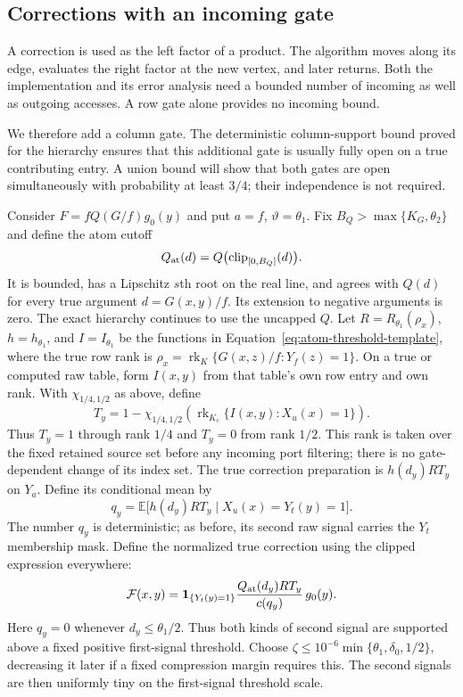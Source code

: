 \subsection{Corrections with an incoming gate}

A correction is used as the left factor of a product. The algorithm moves along its edge, evaluates the right factor at the new vertex, and later returns. Both the implementation and its error analysis need a bounded number of incoming as well as outgoing accesses. A row gate alone provides no incoming bound.

We therefore add a column gate. The deterministic column-support bound proved for the hierarchy ensures that this additional gate is usually fully open on a true contributing entry. A union bound will show that both gates are open simultaneously with probability at least $3/4$; their independence is not required.

Consider $F=fQ(G/f)g_0(y)$ and put $a=f$, $\vartheta=\theta_1$.
Fix $B_Q>\max\{K_G,\theta_2\}$ and define the atom cutoff
\[
 Q_{\rm at}(d)=Q\bigl(\operatorname{clip}_{[0,B_Q]}(d)\bigr).
\]
It is bounded, has a Lipschitz $s$th root on the real line, and agrees
with $Q(d)$ for every true argument $d=G(x,y)/f$.  Its extension to
negative arguments is zero.  The exact hierarchy continues to use the
uncapped $Q$.  Let $R=R_{\theta_1}(\rho_x)$, $h=h_{\theta_1}$, and
$I=I_{\theta_1}$ be the functions in
Equation~\eqref{eq:atom-threshold-template}, where the true row rank is
$\rho_x=\operatorname{rk}_K\{G(x,z)/f:Y_f(z)=1\}$.
On a true or computed raw table, form $I(x,y)$ from that table's own row
entry and own rank.
With $\chi_{1/4,1/2}$ as above, define
\begin{equation}
 T_y=1-\chi_{1/4,1/2}\left(
       \operatorname{rk}_{K_c}\{I(x,y):X_u(x)=1\}\right).
 \label{eq:atom-incoming-gate}
\end{equation}
Thus $T_y=1$ through rank $1/4$ and $T_y=0$ from rank $1/2$.
This rank is taken over the fixed retained source set before any incoming
port filtering; there is no gate-dependent change of its index set.
The true correction preparation is $h(d_y)R T_y$ on $Y_a$.
Define its conditional mean by
\begin{equation}
 q_y=\mathbb E\bigl[h(d_y)R T_y\mid X_u(x)=Y_t(y)=1\bigr].
 \label{eq:atom-correction-denominator}
\end{equation}
The number $q_y$ is deterministic; as before, its second raw signal
carries the $Y_t$ membership mask.  Define the normalized true correction
using the clipped expression everywhere:
\begin{equation}
 \mathcal F(x,y)=\mathbf1_{\{Y_t(y)=1\}}
     \frac{Q_{\rm at}(d_y)R T_y}{c(q_y)}\,g_0(y).
 \label{eq:atom-correction-table}
\end{equation}
Here $q_y=0$ whenever $d_y\le\theta_1/2$.  Thus both kinds of second
signal are supported above a fixed positive first-signal threshold.
Choose $\zeta\le10^{-6}\min\{\theta_1,\delta_0,1/2\}$, decreasing it
later if a fixed compression margin requires this.  The second signals
are then uniformly tiny on the first-signal threshold scale.

